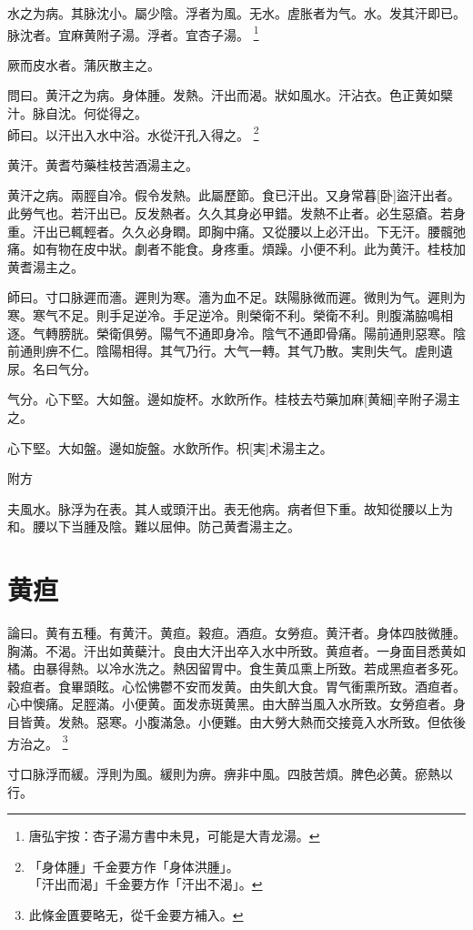 \documentclass[12pt,twoside,UTF8,b5paper]{ctexbook}
\begin{document}
水之为病。其脉沈小。屬少陰。浮者为風。无水。虗胀者为气。水。发其汗即已。脉沈者。宜麻黄附子湯。浮者。宜杏子湯。
	\footnote{唐弘宇按：杏子湯方書中未見，可能是大青龙湯。}

厥而皮水者。蒲灰散主之。

問曰。黄汗之为病。身体腫。发熱。汗出而渴。狀如風水。汗沾衣。色正黄如檗汁。脉自沈。何從得之。\\
師曰。以汗出入水中浴。水從汗孔入得之。
	\footnote{「身体腫」千金要方作「身体洪腫」。\\「汗出而渴」千金要方作「汗出不渴」。}

黄汗。黄耆芍藥桂枝苦酒湯主之。

黄汗之病。兩脛自冷。假令发熱。此屬歷節。食已汗出。又身常暮[卧]盜汗出者。此勞气也。若汗出已。反发熱者。久久其身必甲錯。发熱不止者。必生惡瘡。若身重。汗出已輒輕者。久久必身瞤。即胸中痛。又從腰以上必汗出。下无汗。腰髖弛痛。如有物在皮中狀。劇者不能食。身疼重。煩躁。小便不利。此为黄汗。桂枝加黄耆湯主之。

師曰。寸口脉遲而濇。遲則为寒。濇为血不足。趺陽脉微而遲。微則为气。遲則为寒。寒气不足。則手足逆冷。手足逆冷。則榮衛不利。榮衛不利。則腹滿脇鳴相逐。气轉膀胱。榮衛俱勞。陽气不通即身冷。陰气不通即骨痛。陽前通則惡寒。陰前通則痹不仁。陰陽相得。其气乃行。大气一轉。其气乃散。実則失气。虗則遺尿。名曰气分。

气分。心下堅。大如盤。邊如旋杯。水飲所作。桂枝去芍藥加麻[黄細]辛附子湯主之。

心下堅。大如盤。邊如旋盤。水飲所作。枳[実]术湯主之。

附方

夫風水。脉浮为在表。其人或頭汗出。表无他病。病者但下重。故知從腰以上为和。腰以下当腫及陰。難以屈伸。防己黄耆湯主之。

\chapter{黄疸}

論曰。黄有五種。有黄汗。黄疸。穀疸。酒疸。女勞疸。黄汗者。身体四肢微腫。胸滿。不渴。汗出如黄蘗汁。良由大汗出卒入水中所致。黄疸者。一身面目悉黄如橘。由暴得熱。以冷水洗之。熱因留胃中。食生黄瓜熏上所致。若成黑疸者多死。穀疸者。食畢頭眩。心忪怫鬱不安而发黄。由失飢大食。胃气衝熏所致。酒疸者。心中懊痛。足脛滿。小便黄。面发赤斑黄黑。由大醉当風入水所致。女勞疸者。身目皆黄。发熱。惡寒。小腹滿急。小便難。由大勞大熱而交接竟入水所致。但依後方治之。
	\footnote{此條金匱要略无，從千金要方補入。}

寸口脉浮而緩。浮則为風。緩則为痹。痹非中風。四肢苦煩。脾色必黄。瘀熱以行。
\end{document}
